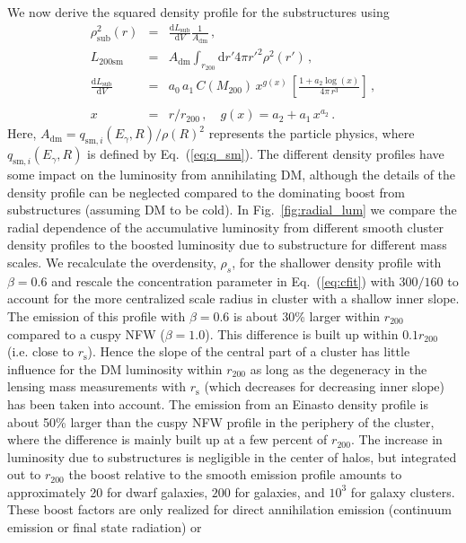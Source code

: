 \documentclass[10pt,aps,pra,reprint,amsmath,amsfonts,amssymb,showpacs,nofootinbib,floatfix]{revtex4-1}
\newcommand{\rmn}{\mathrm}
\newcommand{\s}{\rmn{s}}
\newcommand{\sm}{\rmn{sm}}
\newcommand{\dd}{\rmn{d}}
\newcommand{\rhos}{\ensuremath{\rho_s}}
\newcommand{\rvir}{r_{200}}
\newcommand{\mvir}{M_{200}}
\newcommand{\eg}{E_\gamma}
\begin{document}
We now derive the squared density profile for the substructures
using
\begin{eqnarray}
\rho_\rmn{sub}^2(r) &=& \frac{\dd L_\rmn{sub}}{\dd V} \frac{1}{A_{\rmn{dm}}}\,,\label{eq:rho_sub}\\
L_{200\sm} &=&  A_{\rmn{dm}} \int_{\rvir} \dd r' 4\pi r'^2 \rho^2(r')\,,\label{eq:Lsm}\\
 \frac{\dd L_\rmn{sub}}{\dd V} &=& a_0\,a_1\,C(\mvir)\,x^{g(x)}\,
\left[\frac{1+a_2\log(x)}{4\pi\,r^3}\right]\,,\nonumber\\
\\
x &=& r/\rvir\,,\quad g(x) = a_2+a_1\,x^{a_2}\,.\label{eq:xvir}
\end{eqnarray} 
Here, $A_{\rmn{dm}} = q_{\rmn{sm},i}(\eg,R) / \rho(R)^2$ represents
the particle physics, where $q_{\rmn{sm},i}(\eg,R)$ is defined by
Eq.~(\ref{eq:q_sm}). The different density profiles have some impact
on the luminosity from annihilating DM, although the details of the
density profile can be neglected compared to the dominating boost from
substructures (assuming DM to be cold). In Fig.~\ref{fig:radial_lum}
we compare the radial dependence of the accumulative luminosity from
different smooth cluster density profiles to the boosted luminosity
due to substructure for different mass scales. We recalculate the
overdensity, $\rhos$, for the shallower density profile with
$\beta=0.6$ and rescale the concentration parameter in
Eq.~(\ref{eq:cfit}) with $300/160$ \cite{2011ApJ...728L..39N} to
account for the more centralized scale radius in cluster with a
shallow inner slope. The emission of this profile with $\beta=0.6$ is
about 30\% larger within $\rvir$ compared to a cuspy NFW
($\beta=1.0$).  This difference is built up within $0.1\rvir$
(i.e. close to $r_\s$). Hence the slope of the central part of a
cluster has little influence for the DM luminosity within $\rvir$ as
long as the degeneracy in the lensing mass measurements with $r_\s$
(which decreases for decreasing inner slope) has been taken into
account. The emission from an Einasto density profile is about 50\%
larger than the cuspy NFW profile in the periphery of the cluster,
where the difference is mainly built up at a few percent of
$\rvir$. The increase in luminosity due to substructures is negligible
in the center of halos, but integrated out to $\rvir$ the boost
relative to the smooth emission profile amounts to approximately 20
for dwarf galaxies, $200$ for galaxies, and $10^3$ for galaxy
clusters. These boost factors are only realized for direct
annihilation emission (continuum emission or final state radiation) or
\end{document}
